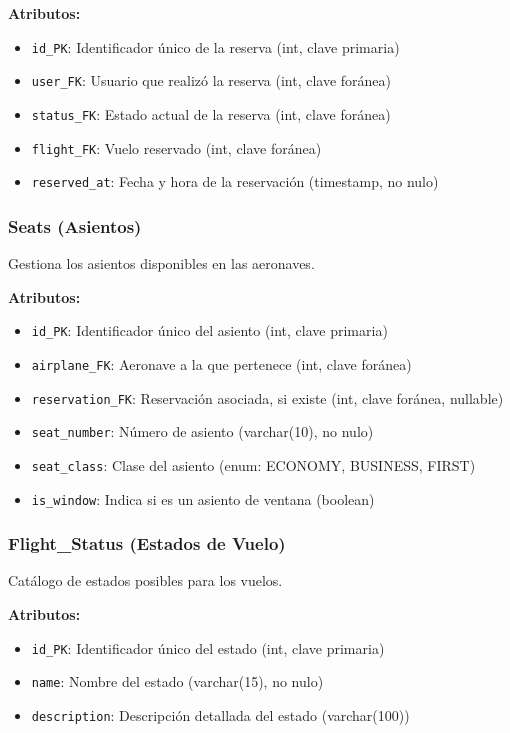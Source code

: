 \documentclass[12pt,a4paper]{article}
\begin{document}
\textbf{Atributos:}
\begin{itemize}
    \item \texttt{id\_PK}: Identificador único de la reserva (int, clave primaria)
    \item \texttt{user\_FK}: Usuario que realizó la reserva (int, clave foránea)
    \item \texttt{status\_FK}: Estado actual de la reserva (int, clave foránea)
    \item \texttt{flight\_FK}: Vuelo reservado (int, clave foránea)
    \item \texttt{reserved\_at}: Fecha y hora de la reservación (timestamp, no nulo)
\end{itemize}

\subsubsection{Seats (Asientos)}
Gestiona los asientos disponibles en las aeronaves.

\textbf{Atributos:}
\begin{itemize}
    \item \texttt{id\_PK}: Identificador único del asiento (int, clave primaria)
    \item \texttt{airplane\_FK}: Aeronave a la que pertenece (int, clave foránea)
    \item \texttt{reservation\_FK}: Reservación asociada, si existe (int, clave foránea, nullable)
    \item \texttt{seat\_number}: Número de asiento (varchar(10), no nulo)
    \item \texttt{seat\_class}: Clase del asiento (enum: ECONOMY, BUSINESS, FIRST)
    \item \texttt{is\_window}: Indica si es un asiento de ventana (boolean)
\end{itemize}

\subsubsection{Flight\_Status (Estados de Vuelo)}
Catálogo de estados posibles para los vuelos.

\textbf{Atributos:}
\begin{itemize}
    \item \texttt{id\_PK}: Identificador único del estado (int, clave primaria)
    \item \texttt{name}: Nombre del estado (varchar(15), no nulo)
    \item \texttt{description}: Descripción detallada del estado (varchar(100))
\end{itemize}
\end{document}

